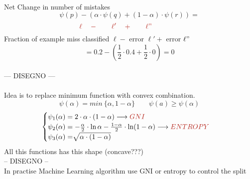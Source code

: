 \documentclass[../main.tex]{subfiles}
\begin{document}
\\
Net Change in number of mistakes\\
$$
\psi(p) - (\alpha \cdot \psi(q) + (1- \alpha ) \cdot \psi (r) ) = 
$$
$$
\red{
\qquad \qquad  \ell \quad- \qquad \ell' \quad+ \qquad \ell" \qquad \qquad  \qquad \qquad 
}$$
Fraction of example miss classified $\ell -$ error $\ell' +$  error $\ell"$ \\
$$
= 0.2 - ( \frac{1}{2} \cdot 0.4 + \frac{1}{2} \cdot 0 ) = 0  
$$
\\
--- DISEGNO ---
\\\\
Idea is to replace minimum function with convex combination.
$$
\psi(\alpha) = min\ \{\alpha, 1-\alpha\} \qquad \psi(a) \geq \psi(\alpha)
$$
$$
\begin{cases}
\psi_1(\alpha) = 2\cdot\alpha \cdot (1-\alpha) \longrightarrow \red{GNI} \\
\psi_2(\alpha)= -\frac{\alpha}{2}\cdot \ln \alpha - \frac{1-\alpha}{2} \cdot \ln (1-\alpha)\longrightarrow \red{ENTROPY} \\
\psi_3(\alpha) = \sqrt[]{\alpha \cdot (1-\alpha
)}
\end{cases}
$$
All this functions has this shape (concave???)\\
-- DISEGNO --
\\
In practise Machine Learning algorithm use GNI or entropy to control the split
\\\\
\end{document}
